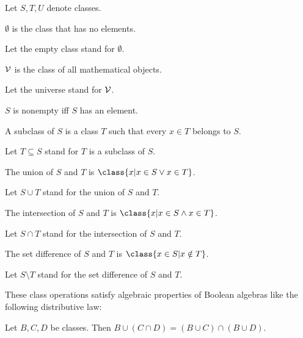 \documentclass{article}
\begin{document}
\begin{forthel}
Let $S, T, U$ denote classes.

\begin{definition}
$\emptyset$ is the class that has no elements.
\end{definition}

Let the empty class stand for $\emptyset$.

\begin{definition}
${\cal V}$ is the class of all mathematical objects.
\end{definition}

Let the universe stand for ${\cal V}$.



\begin{definition}
$S$ is nonempty iff $S$ has an element.
\end{definition}

  \begin{definition}
    A subclass of $S$ is a class $T$ such that every $x \in T$ belongs to $S$.
  \end{definition}

  Let $T \subseteq S$ stand for $T$ is a subclass of $S$.

  \begin{definition}
    The union of $S$ and $T$ is $\class{x | x \in S \vee x \in T}$.
  \end{definition}

  Let $S \cup T$ stand for the union of $S$ and $T$.

  \begin{definition}
    The intersection of $S$ and $T$ is
      $\class{x | x \in S \wedge x \in T}$.
  \end{definition}

  Let $S \cap T$ stand for the intersection of $S$ and $T$.

  \begin{definition}
    The set difference of $S$ and $T$ is $\class{x \in S | x \notin T}$.
  \end{definition}

  Let $S \setminus T$ stand for the set difference of $S$ and $T$.
\end{forthel}
These class operations satisfy algebraic properties of Boolean algebras
like the following distributive law:
\begin{forthel}

\begin{proposition}
Let $B,C,D$ be classes. Then
$B \cup (C \cap D) = (B \cup C) \cap (B \cup D)$.
\end{proposition}
\end{forthel}
\end{document}
